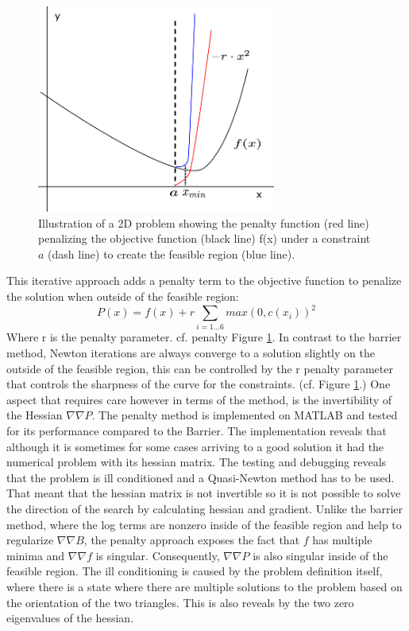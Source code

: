 \documentclass[times,12pt]{ACME2015article}
\begin{document}
\begin{figure}[!h]
\centering
\includegraphics[width=0.7\textwidth]{penalty} \protect\caption{\label{fig13}Illustration of a 2D problem showing the penalty function (red line) penalizing the objective function (black line) f(x) under a constraint $a$ (dash line) to create the feasible region (blue line).}
\end{figure} 

\clearpage

This iterative approach adds a penalty term to the objective function to penalize the solution when outside of the feasible region: 
\begin{equation}\label{eq:penalty}
P(x)=f(x)+r\sum_{i=1...6}max(0,c(x_{i}))^{2}
\end{equation}
Where r is the penalty parameter. cf. penalty Figure \ref{fig13}. In contrast to the barrier method, Newton iterations are always converge to a solution slightly on the outside of the feasible region, this can be controlled by the r penalty parameter that controls the sharpness of the curve for the constraints. (cf. Figure \ref{fig13}.) One aspect that requires care however in terms of the method, is the invertibility of the Hessian $\nabla\nabla P$. 
The penalty method is implemented on MATLAB and tested for its performance compared to the Barrier. The implementation reveals that although it is sometimes for some cases arriving to a good solution it had the numerical problem with its hessian matrix.
The testing and debugging reveals that the problem is ill conditioned and a Quasi-Newton method has to be used. That meant that the hessian matrix is not invertible so it is not possible to solve the direction of the search by calculating hessian and gradient. Unlike the barrier method, where the log terms are nonzero inside of the feasible region and help to regularize $\nabla\nabla B$, the penalty approach exposes the fact that $f$ has multiple minima and  $\nabla\nabla f$ is singular. Consequently, $\nabla\nabla P$ is also singular inside of the feasible region. The ill conditioning is caused by the problem definition itself, where there is a state where there are multiple solutions to the problem based on the orientation of the two triangles. This is also reveals by the two zero eigenvalues of the hessian.
\end{document}
